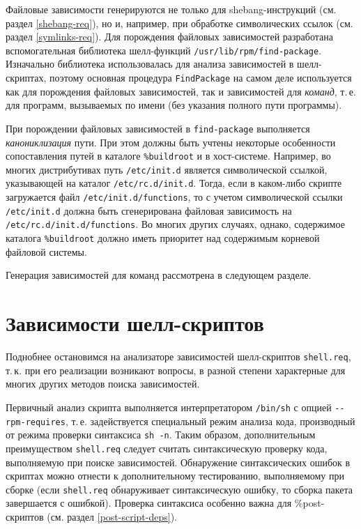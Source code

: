 \documentclass[russian,a4paper,12pt,titlepage]{article}
\begin{document}
Файловые зависимости генерируются не только для shebang-инструкций (см. раздел \ref{shebang-req}),
но и, например, при обработке символических ссылок (см. раздел \ref{symlinks-req}).  Для порождения
файловых зависимостей разработана вспомогательная библиотека шелл-функций \verb|/usr/lib/rpm/find-package|.
Изначально библиотека использовалась для анализа зависимостей в шелл-скриптах, поэтому основная процедура
\verb|FindPackage| на самом деле используется как для порождения файловых зависимостей, так и зависимостей
для \textit{команд}, т.\,е. для программ, вызываемых по имени (без указания полного пути программы).

При порождении файловых зависимостей в \verb|find-package| выполняется \textit{канониклизация} пути.
При этом должны быть учтены некоторые особенности сопоставления путей в каталоге \verb|%buildroot|
и в хост-системе.  Например, во многих дистрибутивах путь \verb|/etc/init.d| является символической
ссылкой, указывающей на каталог \verb|/etc/rc.d/init.d|.  Тогда, если в каком-либо скрипте загружается
файл \verb|/etc/init.d/functions|, то с учетом символической ссылки \verb|/etc/init.d|
должна быть сгенерирована файловая зависимость на \verb|/etc/rc.d/init.d/functions|.
Во многих других случаях, однако, содержимое каталога \verb|%buildroot| должно иметь приоритет над
содержимым корневой файловой системы.

Генерация зависимостей для команд рассмотрена в следующем разделе.

\section{Зависимости шелл-скриптов}
\label{shell-req}
Поднобнее остановимся на анализаторе зависимостей шелл-скриптов \verb|shell.req|, т.\,к. при
его реализации возникают вопросы, в разной степени характерные для многих других методов
поиска зависимостей.

Первичный анализ скрипта выполняется интерпретатором \verb|/bin/sh| с опцией \verb|--rpm-requires|,
т.\,е. задействуется специальный режим анализа кода, производный от режима проверки синтаксиса \verb|sh -n|.
Таким образом, дополнительным преимуществом \verb|shell.req| следует считать синтаксическую проверку
кода, выполняемую при поиске зависимостей.  Обнаружение синтаксических ошибок в скриптах можно отнести
к дополнительному тестированию, выполняемому при сборке (если \verb|shell.req| обнаруживает синтаксическую ошибку,
то сборка пакета завершается с ошибкой).  Проверка синтаксиса особенно важна для \%post-скриптов (см. раздел
\ref{post-script-deps}).
\end{document}
